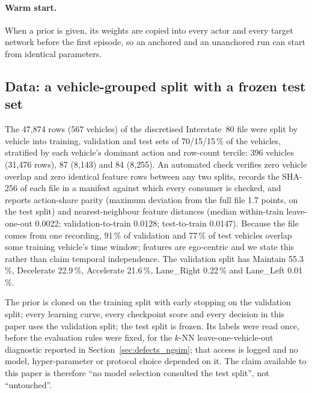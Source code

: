 \paragraph{Warm start.}
When a prior is given, its weights are copied into every actor and every target network before the first episode, so an anchored and an unanchored run can start from identical parameters.

\subsection{Data: a vehicle-grouped split with a frozen test set}
\label{sec:contract_data}

The 47{,}874 rows (567 vehicles) of the discretised Interstate~80 file were split by vehicle into training, validation and test sets of 70/15/15\,\% of the vehicles, stratified by each vehicle's dominant action and row-count tercile: 396 vehicles (31{,}476 rows), 87 (8{,}143) and 84 (8{,}255). An automated check verifies zero vehicle overlap and zero identical feature rows between any two splits, records the SHA-256 of each file in a manifest against which every consumer is checked, and reports action-share parity (maximum deviation from the full file 1.7 points, on the test split) and nearest-neighbour feature distances (median within-train leave-one-out 0.0022; validation-to-train 0.0128; test-to-train 0.0147). Because the file comes from one recording, 91\,\% of validation and 77\,\% of test vehicles overlap some training vehicle's time window; features are ego-centric and we state this rather than claim temporal independence. The validation split has Maintain 55.3\,\%, Decelerate 22.9\,\%, Accelerate 21.6\,\%, Lane\_Right 0.22\,\% and Lane\_Left 0.01\,\%.

The prior is cloned on the training split with early stopping on the validation split; every learning curve, every checkpoint score and every decision in this paper uses the validation split; the test split is frozen. Its labels were read once, before the evaluation rules were fixed, for the $k$-NN leave-one-vehicle-out diagnostic reported in Section~\ref{sec:defects_ngsim}; that access is logged and no model, hyper-parameter or protocol choice depended on it. The claim available to this paper is therefore ``no model selection consulted the test split'', not ``untouched''. 

